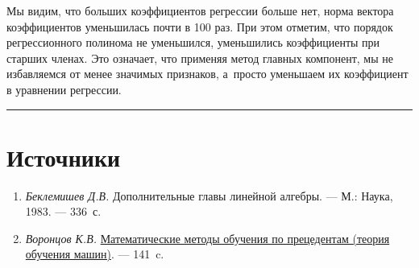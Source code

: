 \documentclass[11pt,a4paper]{article}
\renewcommand{\linethickness}{0.1ex}
\providecommand{\tightlist}{%
      \setlength{\itemsep}{0pt}\setlength{\parskip}{0pt}}
\begin{document}
    Мы видим, что больших коэффициентов регрессии больше нет, норма вектора
коэффициентов уменьшилась почти в 100 раз.
При этом отметим, что порядок
регрессионного полинома не уменьшился, уменьшились коэффициенты при
старших членах.
Это означает, что применяя метод главных компонент, мы не избавляемся от менее значимых признаков, а~просто уменьшаем их коэффициент в уравнении регрессии.

    \begin{center}\rule{0.5\linewidth}{\linethickness}\end{center}

    \hypertarget{ux438ux441ux442ux43eux447ux43dux438ux43aux438}{%
\section{Источники}\label{ux438ux441ux442ux43eux447ux43dux438ux43aux438}}

\begin{enumerate}
\def\labelenumi{\arabic{enumi}.}
\tightlist
\item
  \emph{Беклемишев Д.В.} Дополнительные главы линейной алгебры. --- М.:
  Наука, 1983. --- 336~с.
\item
  \emph{Воронцов К.В.}
  \href{http://www.machinelearning.ru/wiki/images/6/6d/Voron-ML-1.pdf}{Математические
  методы обучения по прецедентам (теория обучения машин)}. --- 141~c.
\end{enumerate}




    
    
    
\end{document}
